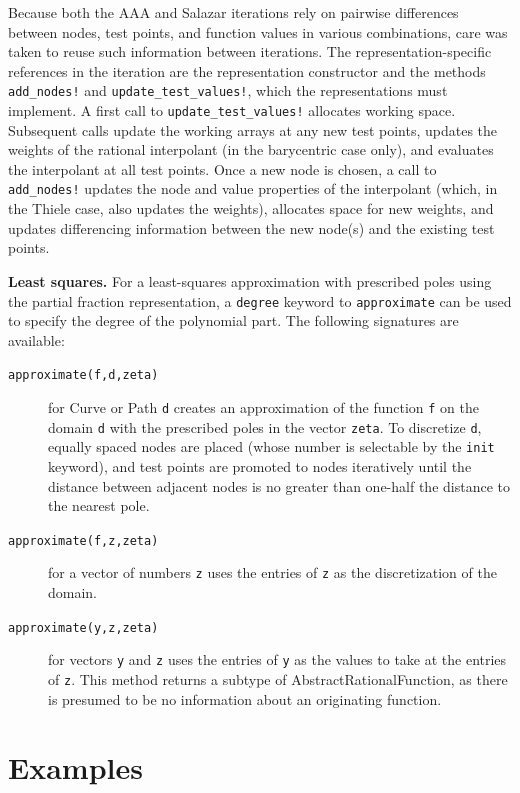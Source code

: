 \documentclass{juliacon}
\begin{document}
Because both the AAA and Salazar iterations rely on pairwise differences between nodes, test points, and function values in various combinations, care was taken to reuse such information between iterations. The representation-specific references in the iteration are the representation constructor and the methods \verb|add_nodes!| and \verb|update_test_values!|, which the representations must implement. A first call to \verb|update_test_values!| allocates working space. Subsequent calls update the working arrays at any new test points, updates the weights of the rational interpolant (in the barycentric case only), and evaluates the interpolant at all test points. Once a new node is chosen, a call to \verb|add_nodes!| updates the node and value properties of the interpolant (which, in the Thiele case, also updates the weights), allocates space for new weights, and updates differencing information between the new node(s) and the existing test points. 

\textbf{Least squares.} For a least-squares approximation with prescribed poles using the partial fraction representation, a \texttt{degree} keyword to \texttt{approximate} can be used to specify the degree of the polynomial part. The following signatures are available:
\begin{description}
    \item[\texttt{approximate(f,d,zeta)}] for \textsf{Curve} or \textsf{Path} \verb|d| creates an approximation of the function \texttt{f} on the domain \verb|d| with the prescribed poles in the vector \verb|zeta|. To discretize \verb|d|, equally spaced nodes are placed (whose number is selectable by the \verb|init| keyword), and test points are promoted to nodes iteratively until the distance between adjacent nodes is no greater than one-half the distance to the nearest pole. 
    \item[\texttt{approximate(f,z,zeta)}] for a vector of numbers \verb|z| uses the entries of \verb|z| as the discretization of the domain.
    \item[\texttt{approximate(y,z,zeta)}] for vectors \verb|y| and \verb|z| uses the entries of \verb|y| as the values to take at the entries of \verb|z|. This method returns a subtype of \textsf{AbstractRationalFunction}, as there is presumed to be no information about an originating function.
\end{description}

\section{Examples}
\end{document}
